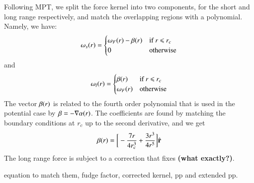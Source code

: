Following MPT, we split  the force kernel into two components, for the short and long range respectively, and 
match the overlapping regions with a polynomial. Namely, we have:
\begin{eqnarray}
{\bf \omega}_{s}(r) = \begin{cases} {\bf \omega}_{F}(r) -  {\bf \beta}(r) &\mbox{if  } \mbox{$r$ $\le$ $r_{c}$ } \\
0 & \mbox{otherwise} 
\end{cases}
\end{eqnarray}
and
\begin{eqnarray}
{\bf \omega}_{l}(r) = \begin{cases} {\bf \beta}(r) &\mbox{if  } \mbox{$r$ $\le$ $r_{c}$ } \\
 {\bf\omega}_{F}(r)  &\mbox{otherwise} 
\end{cases}
\end{eqnarray}
The vector $ {\bf \beta}(r)$ is related to the fourth order polynomial that is used in the potential case by
 $ {\bf \beta} = - {\bf \nabla} \alpha(r)$. The coefficients are found by matching the boundary conditions at $r_{c}$ up to the second derivative,
 and we get
  \begin{eqnarray}
   {\bf \beta}(r) = \bigg[ -\frac{7 r}{4 r_{c}^{3}} + \frac{3 r^{3}}{4 r^{5}}\bigg] \hat{\bf r}
  \end{eqnarray}
The long range force is subject to a correction that fixes {\bf (what exactly?)}.


 equation to match them, fudge factor,
corrected kernel, pp and extended pp.

